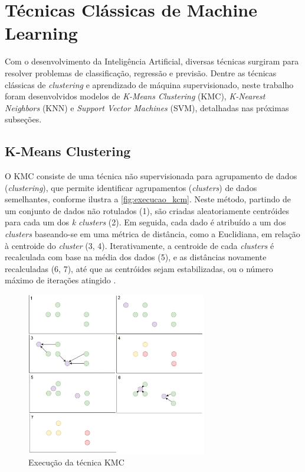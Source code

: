 \section{Técnicas Clássicas de Machine Learning}

Com o desenvolvimento da Inteligência Artificial, diversas técnicas surgiram para resolver problemas de classificação, regressão e previsão. Dentre as técnicas clássicas de \textit{clustering} e aprendizado de máquina supervisionado, neste trabalho foram desenvolvidos modelos de \textit{K-Means Clustering} (KMC), \textit{K-Nearest Neighbors} (KNN) e \textit{Support Vector Machines} (SVM), detalhadas nas próximas subseções.

\subsection{K-Means Clustering}

O KMC consiste de uma técnica não supervisionada para agrupamento de dados (\textit{clustering}), que permite identificar agrupamentos (\textit{clusters}) de dados semelhantes, conforme ilustra a \autoref{fig:execucao_kcm}. Neste método, partindo de um conjunto de dados não rotulados (1), são criadas aleatoriamente centróides para cada um dos \textit{k clusters} (2). Em seguida, cada dado é atribuído a um dos \textit{clusters} baseando-se em uma métrica de distância, como a Euclidiana, em relação à centroide do \textit{cluster} (3, 4). Iterativamente, a centroide de cada \textit{clusters} é recalculada com base na média dos dados (5), e as distâncias novamente recalculadas (6, 7), até que as centróides sejam estabilizadas, ou o número máximo de iterações atingido \cite{foley2019,nisbet2009}.

\begin{figure}[h]
  \centering
  \caption{Execução da técnica KMC}
   \label{fig:execucao_kcm}
   \includegraphics[width=0.7\textwidth]{figuras/fig_5.png}
\end{figure}

